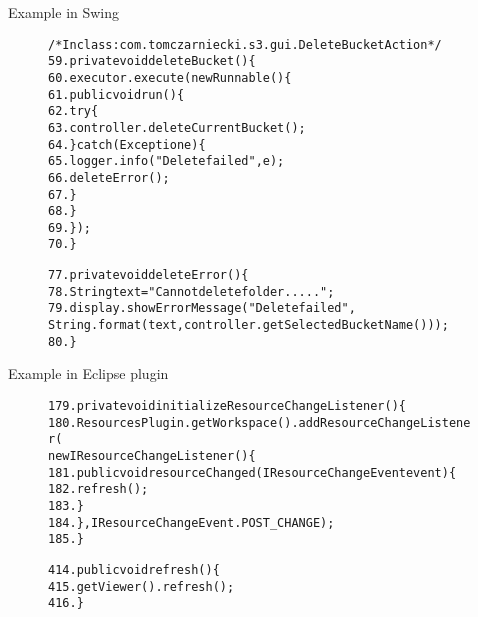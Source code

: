 Example in Swing
\begin{figure}[t]
\begin{CodeOut}
\begin{alltt}
/* In class: com.tomczarniecki.s3.gui.DeleteBucketAction */
59.private void deleteBucket() \{
60.    executor.execute(new Runnable() \{
61.        public void run() \{
62.            try \{
63.                controller.deleteCurrentBucket();
64.            \} catch (Exception e) \{
65.                logger.info("Delete failed", e);
66.                deleteError(); 
67.            \}
68.       \}
69.    \});
70.\}

77.private void deleteError() \{
78.    String text = "Cannot delete folder .....";
79.    display.showErrorMessage("Delete failed", 
        String.format(text, controller.getSelectedBucketName())); 
80.\}
\end{alltt}
\end{CodeOut}
\vspace*{-2.0ex}  %
\end{figure}


Example in  Eclipse plugin
\begin{figure}[t]
\begin{CodeOut}
\begin{alltt}
179.private void initializeResourceChangeListener() \{
180.  ResourcesPlugin.getWorkspace().addResourceChangeListener(
        new IResourceChangeListener() \{
181.      public void resourceChanged(IResourceChangeEvent event) \{
182.        refresh();
183.      \}
184.  \}, IResourceChangeEvent.POST\_CHANGE);
185.\}

414.public void refresh() \{
415.  getViewer().refresh();
416.\}
\end{alltt}
\end{CodeOut}
\vspace*{-2.0ex}  %
\end{figure}


